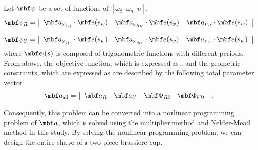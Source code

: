 \documentclass[E]{scitrans}
\begin{document}
 Let $ \mbold{\psi}$ be a set of functions of $[\omega_{\xi} \;\; \omega_{\eta} \;\; \upsilon] $. 
\begin{equation}\label{eq:R_eq}
\mbold{\psi}_R = \left[ \begin{array}{ccc} \mbold{a}_{\omega_{\xi_R}} \cdot \mbold{e}(s_w) & \mbold{a}_{\omega_{\eta_R}} \cdot \mbold{e}(s_w)& \mbold{a}_{\upsilon_R} \cdot \mbold{e}(s_w) \end{array} \right]
\end{equation}

\begin{equation}\label{eq:U_eq}
\mbold{\psi}_U = \left[ \begin{array}{ccc} \mbold{a}_{\omega_{\xi_U}} \cdot  \mbold{e}(s_w) & \mbold{a}_{\omega_{\eta_U}} \cdot  \mbold{e}(s_w) & \mbold{a}_{\upsilon_U} \cdot  \mbold{e}(s_w)  \end{array} \right]
\end{equation}
where $ \mbold{e}_i(s) $ is composed of trigonometric functions with different periods. 
From above, the objective function, which is expressed as , and the geometric constraints, which are expressed as   are described by the following total parameter vector 
\begin{equation}\label{eq:TotalCoefs}
\mbold{a}_{\mathrm{all}} = \left[ \begin{array}{cccc}
\mbold{a}_R & \mbold{a}_U & \mbold{\Phi}_{R0} &\mbold{\Phi}_{U0} 
\end{array}\right].
\end{equation}

Consequently, this problem can be converted into a nonlinear programming problem of $ \mbold{a} $, which is solved using the multiplier method and Nelder-Mead method in this study. By solving the nonlinear programming problem, we can design the entire shape of a two-piece brassiere cup. 
\end{document}
